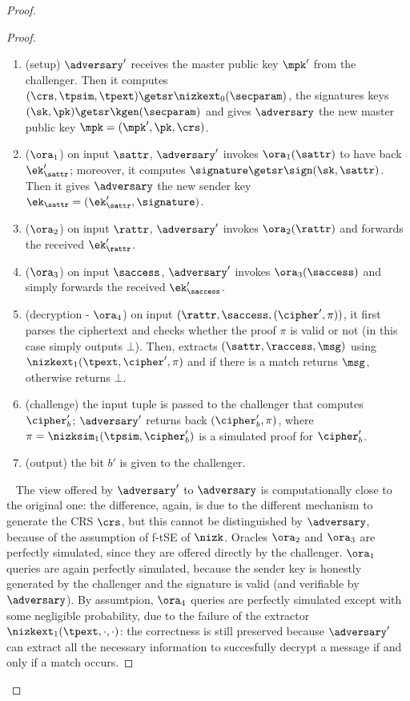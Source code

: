 \begin{proof}
\begin{lemma}
\begin{proof}
            \begin{enumerate}
                \item (setup) $\adversary'$ receives the master public key $\mpk'$ from the challenger. Then it computes $(\crs,\tpsim,\tpext)\getsr\nizkext_0(\secparam)$, the signatures keys $(\sk, \pk) \getsr \kgen(\secparam)$ and gives $\adversary$ the new master public key $\mpk = (\mpk', \pk, \crs)$.
                \item ($\ora_1$) on input $\sattr$, $\adversary'$ invokes $\ora_1(\sattr)$ to have back $\ek'_\sattr$; moreover, it computes $\signature \getsr \sign(\sk, \sattr)$. Then it gives $\adversary$ the new sender key $\ek_\sattr = (\ek'_\sattr, \signature)$.
                \item ($\ora_2$) on input $\rattr$, $\adversary'$ invokes $\ora_2(\rattr)$ and forwards the received $\ek'_\rattr$.
                \item ($\ora_3$) on input $\saccess$, $\adversary'$ invokes $\ora_3(\saccess)$ and simply forwards the received $\ek'_\saccess$.
                \item (decryption - $\ora_4$) on input $(\rattr, \saccess, (\cipher', \pi))$, it first parses the ciphertext and checks whether the proof $\pi$ is valid or not (in this case simply outputs $\bot$). Then, extracts $(\sattr, \raccess, \msg)$ using $\nizkext_1(\tpext,\cipher',\pi)$ and if there is a match returns $\msg$, otherwise returns $\bot$.
                \item (challenge) the input tuple is passed to the challenger that computes $\cipher'_b$; $\adversary'$ returns back $(\cipher'_b, \pi)$, where $\pi = \nizksim_1(\tpsim, \cipher'_b)$ is a simulated proof for $\cipher'_b$.
                \item (output) the bit $b'$ is given to the challenger.
            \end{enumerate}
            ~\newline
            The view offered by $\adversary'$ to $\adversary$ is computationally close to the original one: the difference, again, is due to the different mechanism to generate the CRS $\crs$, but this cannot be distinguished by $\adversary$, because of the assumption of f-tSE of $\nizk$.
            Oracles $\ora_2$ and $\ora_3$ are perfectly simulated, since they are offered directly by the challenger.
            $\ora_1$ queries are again perfectly simulated, because the sender key is honestly generated by the challenger and the signature is valid (and verifiable by $\adversary$).
            By assumtpion, $\ora_4$ queries are perfectly simulated except with some negligible probability, due to the failure of the extractor $\nizkext_1(\tpext, \cdot, \cdot)$: the correctness is still preserved because $\adversary'$ can extract all the necessary information to succesfully decrypt a message if and only if a match occurs.
        \end{proof}
    \end{lemma}


\end{proof}
